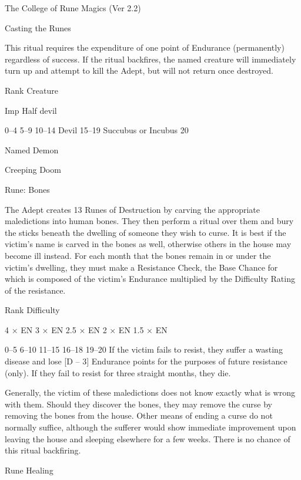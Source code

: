 \begin{Chapter}{The College of Rune Magics (Ver 2.2)}
\begin{ritual}[R-3]{Casting the Runes }
\begin{effects}
This ritual requires the expenditure of one point of Endurance
(permanently) regardless of success.  If the ritual backfires, the
named creature will immediately turn up and attempt to kill the Adept,
but will not return once destroyed.

Rank  Creature 

Imp 
Half devil 

0–4 
5–9 
10–14  Devil 
15–19  Succubus or Incubus 
20 

Named Demon 

\end{effects}
\end{ritual}

\begin{ritual}[R-4]{Creeping Doom }

Rune: Bones 
\begin{effects}
The Adept creates 13 Runes of Destruction by carving the appropriate
maledictions into human bones.  They then perform a ritual over them
and bury the sticks beneath the dwelling of someone they wish to
curse. It is best if the victim’s name is carved in the bones as well,
otherwise others in the house may become ill instead. For each month
that the bones remain in or under the victim’s dwelling, they must
make a Resistance Check, the Base Chance for which is composed of the
victim’s Endurance multiplied by the Difficulty Rating of the
resistance.

Rank  Difficulty 

4 × EN 
3 × EN 
2.5 × EN 
2 × EN 
1.5 × EN 

0–5 
6–10 
11–15 
16–18 
19–20 
If  the  victim  fails  to  resist,  they  suffer  a  wasting 
disease  and  lose  [D  –  3]  Endurance  points  for  the 
purposes  of  future  resistance  (only).  If  they  fail  to 
resist for three straight months, they die. 

Generally, the victim of these maledictions does not know exactly what
is wrong with them. Should they discover the bones, they may remove
the curse by removing the bones from the house. Other means of ending
a curse do not normally suffice, although the sufferer would show
immediate improvement upon leaving the house and sleeping elsewhere
for a few weeks.  There is no chance of this ritual backfiring.
\end{effects}
\end{ritual}

\begin{ritual}[R-5]{Rune Healing }


\end{ritual}
\end{Chapter}
